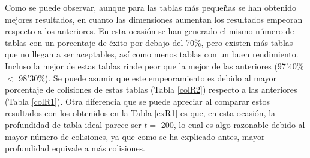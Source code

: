 \documentclass[12pt,spanish,listoffigures,listoftables]{tfgetsinf}
\begin{document}
\def\arraystretch{1.5}
\begin{table}[H]
	\centering
	\caption{Porcentajes de éxito para las tablas que emplean \textbf{R2}}
	\label{exR2}
\end{table}

Como se puede observar, aunque para las tablas más pequeñas se han obtenido mejores resultados, en cuanto las dimensiones aumentan los resultados empeoran respecto a los anteriores. En esta ocasión se han generado el mismo número de tablas con un porcentaje de éxito por debajo del 70\%, pero existen más tablas que no llegan a ser aceptables, así como menos tablas con un buen rendimiento. Incluso la mejor de estas tablas rinde peor que la mejor de las anteriores (97'40\% $<$ 98'30\%). Se puede asumir que este empeoramiento es debido al mayor porcentaje de colisiones de estas tablas (Tabla \ref{colR2}) respecto a las anteriores (Tabla \ref{colR1}). Otra diferencia que se puede apreciar al comparar estos resultados con los obtenidos en la Tabla \ref{exR1} es que, en esta ocasión, la profundidad de tabla ideal parece ser $t =$ 200, lo cual es algo razonable debido al mayor número de colisiones, ya que como se ha explicado antes, mayor profundidad equivale a más colisiones.
\end{document}

